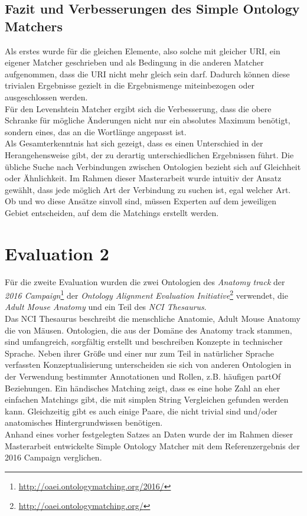 		\subsection{Fazit und Verbesserungen des Simple Ontology Matchers}
		Als erstes wurde für die gleichen Elemente, also solche mit gleicher URI, ein
		eigener Matcher geschrieben und als Bedingung in die anderen Matcher
		aufgenommen, dass die URI nicht mehr gleich sein darf. Dadurch können diese
		trivialen Ergebnisse gezielt in die Ergebnismenge miteinbezogen oder
		ausgeschlossen werden.\\
		Für den Levenshtein Matcher ergibt sich die Verbesserung, dass die obere
		Schranke für mögliche Änderungen nicht nur ein absolutes Maximum benötigt,
		sondern eines, das an die Wortlänge angepasst ist.\\
		Als Gesamterkenntnis hat sich gezeigt, dass es einen Unterschied in der
		Herangehensweise gibt, der zu derartig unterschiedlichen Ergebnissen führt.
		Die übliche Suche nach Verbindungen zwischen Ontologien bezieht sich auf
		Gleichheit oder Ähnlichkeit. Im Rahmen dieser Masterarbeit wurde intuitiv der
		Ansatz gewählt, dass jede möglich Art der Verbindung zu suchen ist, egal
		welcher Art. Ob und wo diese Ansätze sinvoll sind, müssen Experten auf dem
		jeweiligen Gebiet entscheiden, auf dem die Matchings erstellt werden.
		
		\section{Evaluation 2}
		\label{subsec:Evaluation 2}
		Für die zweite Evaluation wurden die zwei Ontologien des \textit{Anatomy track} der
		\textit{2016 Campaign}\footnote{\url{http://oaei.ontologymatching.org/2016/}} der
		\textit{Ontology Alignment Evaluation
		Initiative}\footnote{\url{http://oaei.ontologymatching.org/}} verwendet,
		die \textit{Adult Mouse Anatomy} und ein Teil des \textit{NCI Thesaurus}.\\
		Das NCI Thesaurus beschreibt die menschliche Anatomie, Adult Mouse Anatomy die von
		Mäusen. Ontologien, die aus der Domäne des Anatomy track stammen, sind
		umfangreich, sorgfältig erstellt und beschreiben Konzepte in technischer
		Sprache. Neben ihrer Größe und einer nur zum Teil in natürlicher Sprache
		verfassten Konzeptualisierung unterscheiden sie sich von anderen Ontologien in
		der Verwendung bestimmter Annotationen und Rollen, z.B. häufigen partOf
		Beziehungen. Ein händisches Matching zeigt, dass es eine hohe Zahl an eher
		einfachen Matchings gibt, die mit simplen String Vergleichen gefunden werden
		kann. Gleichzeitig gibt es auch einige Paare, die nicht trivial sind und/oder
		anatomisches Hintergrundwissen benötigen.\cite{OAEI16}\\
		Anhand eines vorher festgelegten Satzes an Daten
		wurde der im Rahmen dieser Masterarbeit entwickelte Simple Ontology Matcher
		mit dem Referenzergebnis der 2016 Campaign verglichen.
		
